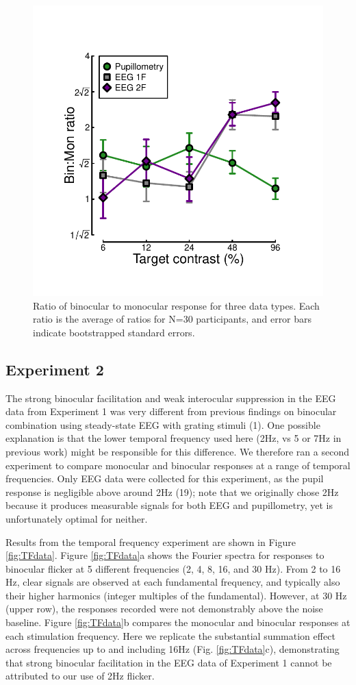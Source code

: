 \documentclass[
]{article}
\begin{document}
\begin{figure}

{\centering \includegraphics[width=0.5\linewidth]{Figures/BSratios} 

}

\caption{Ratio of binocular to monocular response for three data types. Each ratio is the average of ratios for N=30 participants, and error bars indicate bootstrapped standard errors.}\label{fig:BSratios}
\end{figure}

\hypertarget{experiment-2}{%
\subsection{Experiment 2}\label{experiment-2}}

The strong binocular facilitation and weak interocular suppression in the EEG data from Experiment 1 was very different from previous findings on binocular combination using steady-state EEG with grating stimuli (1). One possible explanation is that the lower temporal frequency used here (2Hz, vs 5 or 7Hz in previous work) might be responsible for this difference. We therefore ran a second experiment to compare monocular and binocular responses at a range of temporal frequencies. Only EEG data were collected for this experiment, as the pupil response is negligible above around 2Hz (19); note that we originally chose 2Hz because it produces measurable signals for both EEG and pupillometry, yet is unfortunately optimal for neither.

Results from the temporal frequency experiment are shown in Figure \ref{fig:TFdata}. Figure \ref{fig:TFdata}a shows the Fourier spectra for responses to binocular flicker at 5 different frequencies (2, 4, 8, 16, and 30 Hz). From 2 to 16 Hz, clear signals are observed at each fundamental frequency, and typically also their higher harmonics (integer multiples of the fundamental). However, at 30 Hz (upper row), the responses recorded were not demonstrably above the noise baseline. Figure \ref{fig:TFdata}b compares the monocular and binocular responses at each stimulation frequency. Here we replicate the substantial summation effect across frequencies up to and including 16Hz (Fig. \ref{fig:TFdata}c), demonstrating that strong binocular facilitation in the EEG data of Experiment 1 cannot be attributed to our use of 2Hz flicker.
\end{document}
